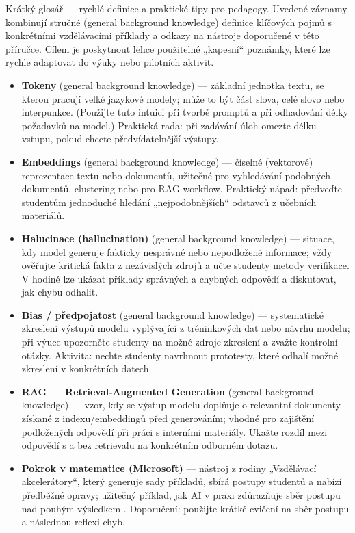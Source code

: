 Krátký glosář — rychlé definice a praktické tipy pro pedagogy. Uvedené záznamy kombinují stručné (general background knowledge) definice klíčových pojmů s konkrétními vzdělávacími příklady a odkazy na nástroje doporučené v této příručce. Cílem je poskytnout lehce použitelné „kapesní“ poznámky, které lze rychle adaptovat do výuky nebo pilotních aktivit.
\begin{itemize}
\item \textbf{Tokeny} (general background knowledge) --- základní jednotka textu, se kterou pracují velké jazykové modely; může to být část slova, celé slovo nebo interpunkce. (Použijte tuto intuici při tvorbě promptů a při odhadování délky požadavků na model.) Praktická rada: při zadávání úloh omezte délku vstupu, pokud chcete předvídatelnější výstupy.
\item \textbf{Embeddings} (general background knowledge) --- číselné (vektorové) reprezentace textu nebo dokumentů, užitečné pro vyhledávání podobných dokumentů, clustering nebo pro RAG‑workflow. Praktický nápad: předveďte studentům jednoduché hledání „nejpodobnějších“ odstavců z učebních materiálů.
\item \textbf{Halucinace (hallucination)} (general background knowledge) --- situace, kdy model generuje fakticky nesprávné nebo nepodložené informace; vždy ověřujte kritická fakta z nezávislých zdrojů a učte studenty metody verifikace. V hodině lze ukázat příklady správných a chybných odpovědí a diskutovat, jak chybu odhalit.
\item \textbf{Bias / předpojatost} (general background knowledge) --- systematické zkreslení výstupů modelu vyplývající z tréninkových dat nebo návrhu modelu; při výuce upozorněte studenty na možné zdroje zkreslení a zvažte kontrolní otázky. Aktivita: nechte studenty navrhnout prototesty, které odhalí možné zkreslení v konkrétních datech.
\item \textbf{RAG — Retrieval‑Augmented Generation} (general background knowledge) --- vzor, kdy se výstup modelu doplňuje o relevantní dokumenty získané z indexu/embeddingů před generováním; vhodné pro zajištění podložených odpovědí při práci s interními materiály. Ukažte rozdíl mezi odpovědí s a bez retrievalu na konkrétním odborném dotazu.
\item \textbf{Pokrok v matematice (Microsoft)} --- nástroj z rodiny „Vzdělávací akcelerátory“, který generuje sady příkladů, sbírá postupy studentů a nabízí předběžné opravy; užitečný příklad, jak AI v praxi zdůrazňuje sběr postupu nad pouhým výsledkem \cite{kb_ai_101_tipu_pdf_04e4a115_page_8_1}. Doporučení: použijte krátké cvičení na sběr postupu a následnou reflexi chyb.

\end{itemize}
